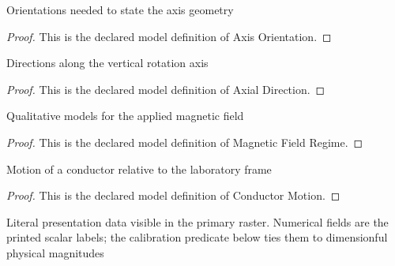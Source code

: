\begin{definition}
  \label{def:physics:phyx-mini-0982:phyxminiproblems-problemphyxmini0982-axisorientation}
  Orientations needed to state the axis geometry
\end{definition}
\begin{proof}
  This is the declared model definition of Axis Orientation.
\end{proof}
\begin{definition}
  \label{def:physics:phyx-mini-0982:phyxminiproblems-problemphyxmini0982-axialdirection}
  Directions along the vertical rotation axis
\end{definition}
\begin{proof}
  This is the declared model definition of Axial Direction.
\end{proof}
\begin{definition}
  \label{def:physics:phyx-mini-0982:phyxminiproblems-problemphyxmini0982-magneticfieldregime}
  Qualitative models for the applied magnetic field
\end{definition}
\begin{proof}
  This is the declared model definition of Magnetic Field Regime.
\end{proof}
\begin{definition}
  \label{def:physics:phyx-mini-0982:phyxminiproblems-problemphyxmini0982-conductormotion}
  Motion of a conductor relative to the laboratory frame
\end{definition}
\begin{proof}
  This is the declared model definition of Conductor Motion.
\end{proof}
\begin{definition}
  \label{def:physics:phyx-mini-0982:phyxminiproblems-problemphyxmini0982-rotatingspherecircuitfigure}
  Literal presentation data visible in the primary raster. Numerical fields are the printed scalar labels; the calibration predicate below ties them to dimensionful physical magnitudes
\end{definition}
